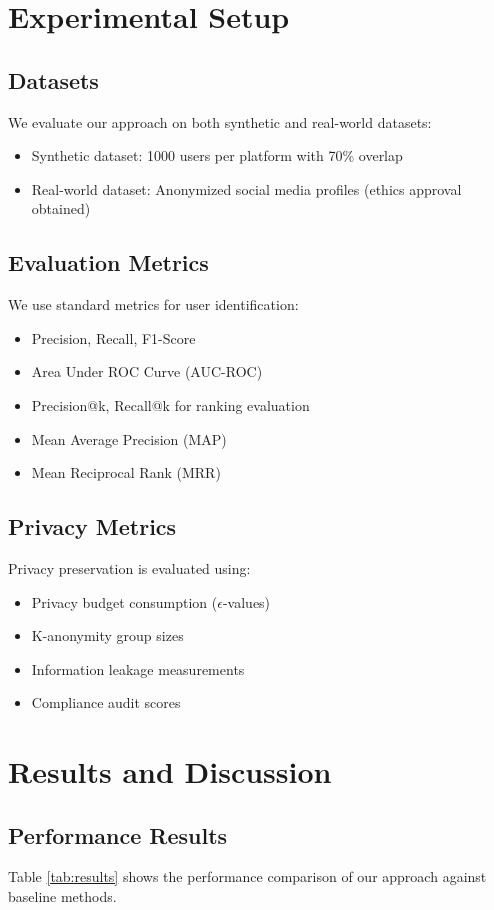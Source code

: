 \documentclass[conference]{IEEEtran}
\begin{document}
\section{Experimental Setup}

\subsection{Datasets}
We evaluate our approach on both synthetic and real-world datasets:
\begin{itemize}
\item Synthetic dataset: 1000 users per platform with 70\% overlap
\item Real-world dataset: Anonymized social media profiles (ethics approval obtained)
\end{itemize}

\subsection{Evaluation Metrics}
We use standard metrics for user identification:
\begin{itemize}
\item Precision, Recall, F1-Score
\item Area Under ROC Curve (AUC-ROC)
\item Precision@k, Recall@k for ranking evaluation
\item Mean Average Precision (MAP)
\item Mean Reciprocal Rank (MRR)
\end{itemize}

\subsection{Privacy Metrics}
Privacy preservation is evaluated using:
\begin{itemize}
\item Privacy budget consumption ($\epsilon$-values)
\item K-anonymity group sizes
\item Information leakage measurements
\item Compliance audit scores
\end{itemize}

\section{Results and Discussion}

\subsection{Performance Results}
Table \ref{tab:results} shows the performance comparison of our approach against baseline methods.
\end{document}
